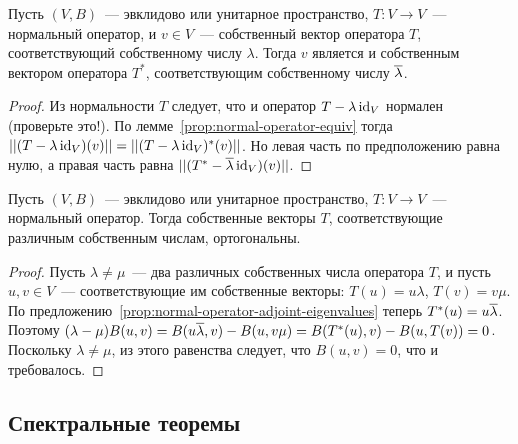 \begin{proposition}\label{prop:normal-operator-adjoint-eigenvalues}
Пусть $(V,B)$~--- эвклидово или унитарное пространство,
$T\colon V\to V$~--- нормальный оператор, и $v\in V$~--- собственный
вектор оператора $T$, соответствующий собственному числу $\lambda$.
Тогда $v$ является и собственным вектором оператора $T^*$,
соответствующим собственному числу $\overline\lambda$.
\end{proposition}
\begin{proof}
Из нормальности $T$ следует, что и оператор $T - \lambda\operatorname{id}_V$
нормален (проверьте это!).
По лемме~\ref{prop:normal-operator-equiv} тогда
$||(T-\lambda\operatorname{id}_V)(v)|| = ||(T-\lambda\operatorname{id}_V)^*(v)||$.
Но левая часть по предположению равна нулю,
а правая часть равна $||(T^*-\overline\lambda\operatorname{id}_V)(v)||$.
\end{proof}

\begin{proposition}
Пусть $(V,B)$~--- эвклидово или унитарное пространство,
$T\colon V\to V$~--- нормальный оператор. Тогда собственные векторы
$T$, соответствующие различным собственным числам, ортогональны.
\end{proposition}
\begin{proof}
Пусть $\lambda\neq\mu$~--- два различных собственных числа
оператора $T$, и пусть $u,v\in V$~--- соответствующие им
собственные векторы: $T(u) = u\lambda$, $T(v) = v\mu$.
По предложению~\ref{prop:normal-operator-adjoint-eigenvalues}
теперь $T^*(u) = u\overline\lambda$.
Поэтому $(\lambda-\mu)B(u,v) = B(u\overline\lambda,v) - B(u,v\mu)
= B(T^*(u),v) - B(u,T(v)) = 0$.
Поскольку $\lambda\neq\mu$, из этого равенства следует, что
$B(u,v)=0$, что и требовалось.
\end{proof}

\subsection{Спектральные теоремы}


